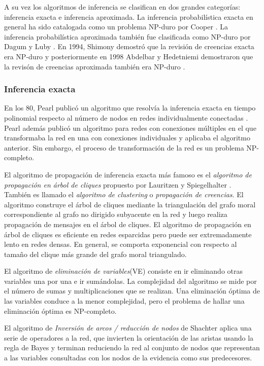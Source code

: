 A su vez los algoritmos de inferencia se clasifican en dos grandes categorías: inferencia exacta e inferencia aproximada. 	La inferencia probabilística exacta en general ha sido catalogada como un problema NP-duro por Cooper \cite{COOPER1990393}. La inferencia probabilística aproximada también fue clasificada como NP-duro por Dagum y Luby \cite{DAGUM1993141}. En 1994, Shimony demostró que la revisión de creencias exacta era NP-duro \cite{SHIMONY1994399} y posteriormente en 1998 Abdelbar y Hedetniemi demostraron que la revisón de creencias aproximada también era NP-duro \cite{ABDELBAR199821}.

\subsubsection{Inferencia exacta}
\label{subsec:exact-inference}			
En los 80, Pearl publicó un algoritmo que resolvía la inferencia exacta en tiempo polinomial respecto al número de nodos en redes individualmente conectadas \cite{PEARL1986241}. Pearl además publicó un algoritmo para redes con conexiones múltiples en el que transformaba la red en una con conexiones individuales y aplicaba el algoritmo anterior. Sin embargo, el proceso de transformación de la red es un problema NP-completo.

El algoritmo de propagación de inferencia exacta más famoso es el \textit{algoritmo de propagación en árbol de cliques} propuesto por Lauritzen y Spiegelhalter \cite{lauritzen1988local}. También es llamado el \textit{algoritmo de clustering} o \textit{propagación de creencias}. El algoritmo construye el árbol de cliques mediante la triangulación del grafo moral correspondiente al grafo no dirigido subyacente en la red y luego realiza propagación de mensajes en el árbol de cliques. El algoritmo de propagación en árbol de cliques es eficiente en redes esparcidas pero puede ser extremadamente lento en redes densas. En general, se comporta exponencial con respecto al tamaño del clique más grande del grafo moral triangulado.

El algoritmo de \textit{eliminación de variables}(VE)\cite{zhang1994simple} consiste en ir eliminando otras variables una por una e ir sumándolas. La complejidad del algoritmo se mide por el número de sumas y multiplicaciones que se realizan. Una eliminación óptima de las variables conduce a la menor complejidad, pero el problema de hallar una eliminación óptima es NP-completo.

El algoritmo de \textit{Inversión de arcos / reducción de nodos} de Shachter \cite{SHACHTER1990173} \cite{HENRION1990129} aplica una serie de operadores a la red, que invierten la orientación de las aristas usando la regla de Bayes y terminan reduciendo la red al conjunto de nodos que representan a las variables consultadas con los nodos de la evidencia como sus predecesores.

